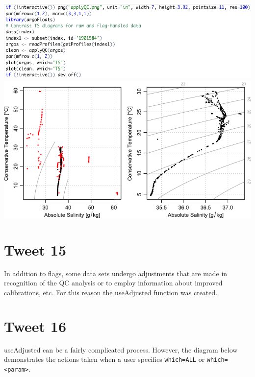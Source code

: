 \documentclass[
]{article}
\begin{document}
\includegraphics{../18_tweets/applyQCCode.png}
\includegraphics{../../../vignettes/applyQC.png}

\hypertarget{tweet-15}{%
\section{Tweet 15}\label{tweet-15}}

In addition to flags, some data sets undergo adjustments that are made
in recognition of the QC analysis or to employ information about
improved calibrations, etc. For this reason the useAdjusted function was
created.

\hypertarget{tweet-16}{%
\section{Tweet 16}\label{tweet-16}}

useAdjusted can be a fairly complicated process. However, the diagram
below demonstrates the actions taken when a user specifies
\texttt{which=ALL} or \texttt{which=\textless{}param\textgreater{}}.
\end{document}
